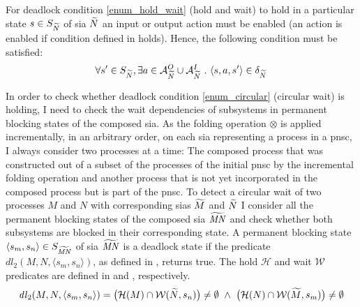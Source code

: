 For deadlock condition \ref{enum_hold_wait} (hold and wait) to hold in a particular state $s \in S_{\widetilde{N}}$ of \gls{sia} $\widetilde{N}$ an input or output action must be enabled (an action is enabled if condition defined in \Equ{\ref{eq_sia_enabled}} holds).
Hence, the following condition must be satisfied:
\begin{equation}
    \label{eq_hold_wait}
    \forall s' \in S_{\descSIA{N}}, \exists a \in \mathcal{A}_{\descSIA{N}}^O \cup \mathcal{A}_{\descSIA{N}}^I \ . \ \langle s, a, s' \rangle \in \delta_{\descSIA{N}}
\end{equation}

In order to check whether deadlock condition \ref{enum_circular} (circular wait) is holding, I need to check the wait dependencies of subsystems in permanent blocking states of the composed \gls{sia}.
As the folding operation $\otimes$ is applied incrementally, in an arbitrary order, on each \gls{sia} representing a process in a \gls{pnsc}, I always consider two processes at a time:
The composed process that was constructed out of a subset of the processes of the initial \gls{pnsc} by the incremental folding operation and another process that is not yet incorporated in the composed process but is part of the \gls{pnsc}.
To detect a circular wait of two processes $M$ and $N$ with corresponding \glspl{sia} $\widetilde{M}$ and $\widetilde{N}$ I consider all the permanent blocking states of the composed \gls{sia} $\widetilde{\mathit{MN}}$ and check whether both subsystems are blocked in their corresponding state.
A permanent blocking state $\langle s_m, s_n \rangle \in S_{\widetilde{\mathit{MN}}}$ of \gls{sia} $\widetilde{\mathit{MN}}$ is a deadlock state if the predicate $\mathit{dl}_2(M, N, \langle s_m, s_n \rangle)$, as defined in \Equ{\ref{eq_circular2}}, returns true.
The hold $\mathcal{H}$ and wait $\mathcal{W}$ predicates are defined in \Equ{\ref{eq_hold}} and \Equ{\ref{eq_wait}}, respectively.
\begin{equation}
    \label{eq_circular2}
    \mathit{dl}_2(M, N, \langle s_m, s_n \rangle) = \big ( \mathcal{H}(M) \cap \mathcal{W}(\descSIA{N}, s_n) \big) \neq \emptyset \ \land \ \big ( \mathcal{H}(N) \cap \mathcal{W}(\descSIA{M}, s_m) \big ) \neq \emptyset
\end{equation}

